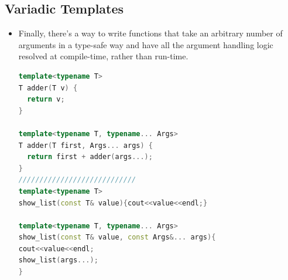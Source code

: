 \documentclass[a4paper,12pt,twoside]{book}
\begin{document}
\subsection{Variadic Templates}
\begin{itemize}
\item Finally, there's a way to write functions that take an arbitrary number of arguments in a type-safe way and have all the argument handling logic resolved at compile-time, rather than run-time.

\begin{lstlisting}[frame=single, language=c++]
template<typename T>
T adder(T v) {
  return v;
}

template<typename T, typename... Args>
T adder(T first, Args... args) {
  return first + adder(args...);
}
////////////////////////////
template<typename T>
show_list(const T& value){cout<<value<<endl;}

template<typename T, typename... Args>
show_list(const T& value, const Args&... args){
cout<<value<<endl;
show_list(args...);
}
\end{lstlisting}





\end{itemize}


\ifx \allfiles \undefined
\end{document}
